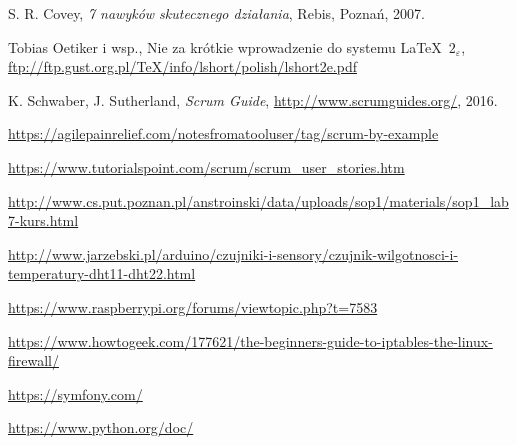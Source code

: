 	\begin{thebibliography}{9}
		
		 S. R. Covey, {\em 7 nawyków skutecznego działania}, Rebis, Poznań, 2007.
		
		 Tobias Oetiker i wsp., Nie za krótkie wprowadzenie do systemu \LaTeX  \ $2_\varepsilon$, \url{ftp://ftp.gust.org.pl/TeX/info/lshort/polish/lshort2e.pdf}
		
		 K. Schwaber, J. Sutherland, {\em Scrum Guide}, \url{http://www.scrumguides.org/}, 2016.
		
		 \url{https://agilepainrelief.com/notesfromatooluser/tag/scrum-by-example}
		
		 \url{https://www.tutorialspoint.com/scrum/scrum_user_stories.htm}
		
		 \url{http://www.cs.put.poznan.pl/anstroinski/data/uploads/sop1/materials/sop1_lab7-kurs.html}
		
		 \url{http://www.jarzebski.pl/arduino/czujniki-i-sensory/czujnik-wilgotnosci-i-temperatury-dht11-dht22.html}
		
		 \url{https://www.raspberrypi.org/forums/viewtopic.php?t=7583}
		
		 \url{https://www.howtogeek.com/177621/the-beginners-guide-to-iptables-the-linux-firewall/}
		
		 \url{https://symfony.com/}
		
		 \url{https://www.python.org/doc/}
		
	\end{thebibliography}